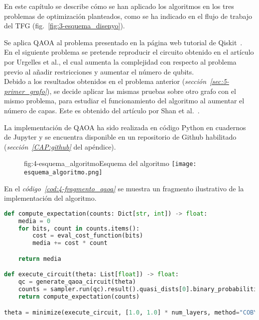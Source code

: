
En este capítulo se describe cómo se han aplicado los algoritmos en los tres problemas de optimización planteados, como se ha indicado en el flujo de trabajo del TFG (fig.~\ref{fig:3-esquema_disenyo}).

Se aplica QAOA al problema presentado en la página web tutorial de Qiskit~\cite{qiskit_tutorial_antiguo}.
\\
En el siguiente problema se pretende reproducir el circuito obtenido en el artículo por Urgelles et al.\cite{multi-objective_routing_optimization}, el cual aumenta la complejidad con respecto al problema previo al añadir restricciones y aumentar el número de qubits.
\\
Debido a los resultados obtenidos en el problema anterior (\textit{sección~\ref{sec:5-primer_grafo}}), se decide aplicar las mismas pruebas sobre otro grafo con el mismo problema, para estudiar el funcionamiento del algoritmo al aumentar el número de capas. Este es obtenido del artículo por Shan et al.~\cite{solving_shortest_path_with_qaoa}.

La implementación de QAOA ha sido realizada en código Python en cuadernos de Jupyter y se encuentra disponible en un repositorio de Github habilitado (\textit{sección~\ref{CAP:github}} del apéndice).

\begin{figure}[Esquema del algoritmo]{fig:4-esquema_algoritmo}{Esquema del algoritmo}
  \centering
  \texttt{[image: esquema\_algoritmo.png]}
\end{figure}

En el \textit{código~\ref{cod:4-fragmento_qaoa}} se muestra un fragmento ilustrativo de la implementación del algoritmo.

\newpage

\begin{lstlisting}[language=Python,label=cod:4-fragmento_qaoa,caption={Fragmento de código de una ejecución de QAOA.},style=numbered]
def compute_expectation(counts: Dict[str, int]) -> float:
    media = 0
    for bits, count in counts.items():
        cost = eval_cost_function(bits)
        media += cost * count

    return media

def execute_circuit(theta: List[float]) -> float:
    qc = generate_qaoa_circuit(theta)
    counts = sampler.run(qc).result().quasi_dists[0].binary_probabilities()
    return compute_expectation(counts)

theta = minimize(execute_circuit, [1.0, 1.0] * num_layers, method="COBYLA")
\end{lstlisting}

